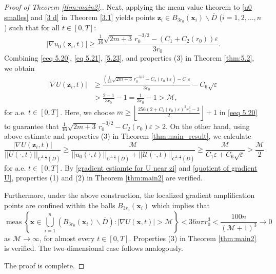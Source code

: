 \documentclass[11pt,reqno,oneside]{amsart}
\numberwithin{equation}{section}
\theoremstyle{definition}
\theoremstyle{remark}
\numberwithin{equation}{section}
\begin{document}
\begin{proof}[Proof of Theorem \ref{thm:main2}.]
		Next, applying the mean value theorem to \eqref{u0 smalles} and \eqref{3 d} in Theorem \ref{3.1} yields points $\mathbf{z}_i \in B_{3r_0}(\mathbf{x}_i) \backslash \overline{D}$ ($i=1,2,\dots,n$) such that for all $t \in [0,T]$:
		\begin{equation}\label{5.23}
			|\nabla u_0(\mathbf{z}_i,t)| \geqslant \frac{
				\tfrac{1}{16}\sqrt{2m+3} \, r_0^{-3/2} - \left(C_1 + C_2(r_0)\right)\varepsilon
			}{3r_0}.
		\end{equation}
		Combining \eqref{eeq 5.20}, \eqref{eq 5.21}, \eqref{5.23}, and properties (3) in Theorem \ref{thm:5.2}, we obtain
		\begin{equation}\label{gradient estiamte for U near zi}
			\begin{aligned}
				|\nabla U(\mathbf{z}_i,t)| &\geqslant \frac{\left(
					\tfrac{1}{16}\sqrt{2m+3} \, r_0^{-3/2} -C_2(r_0)\varepsilon\right)-  C_1\varepsilon
				}{3r_0} - C_6\sqrt{\varepsilon} \\
				& > \frac{2 - 1}{3r_0} - 1 = \frac{1}{3r_0} - 1 > \mathcal{M},
			\end{aligned}
		\end{equation}
		for a.e. $t \in [0,T]$. Here, we choose $m \geqslant \left\lfloor \frac{256(2 + C_2(r_0)\varepsilon)^2 r_{0}^{3} - 3}{2} \right\rfloor +1$ in \eqref{eeq 5.20} to guarantee that  $	\tfrac{1}{16}\sqrt{2m+3} \, r_0^{-3/2} -C_2(r_0)\varepsilon>2 $. On the other hand, using above estimate and properties (3) in Theorem \ref{thm:main_result}, we calculate  
		\begin{equation}\label{quotient of gradient U}
		\frac{|\nabla U(\mathbf{z}_i,t)|}{||U(\cdot,t)||_{C^{1,\frac{1}{2}}(\overline{D})}}\geqslant \frac{\mathcal{M}}{||u_0(\cdot,t)||_{C^{1,\frac{1}{2}}(\overline{D})}+||\mathscr{U}(\cdot,t)||_{C^{1,\frac{1}{2}}(\overline{D})}} \geqslant \frac{\mathcal{M}}{C_1\varepsilon+C_6\sqrt{\varepsilon}} > \frac{\mathcal{M}}{2}
		\end{equation}
		for a.e. $t\in [0,T]$. 	By \eqref{gradient estiamte for U near zi} and \eqref{quotient of gradient U}, properties (1) and (2) in Theorem \ref{thm:main2} are verified. 
		
		Furthermore, under the above construction, the localized gradient amplification points are confined within the balls $B_{3r_0}(\mathbf{x}_i)$ which implies that 
		\begin{equation*}
			\operatorname{meas}\left\{ \mathbf{x} \in \bigcup_{i=1}^{n} \left(B_{3r_0}(\mathbf{x}_i)\backslash \overline{D}\right) : |\nabla U(\mathbf{x},t)| > \mathcal{M} \right\} < 36n\pi r_0^3 < \frac{100n}{(\mathcal{M} + 1)^3}  \to 0
		\end{equation*}
		as $\mathcal{M} \to \infty$, for almost every $t \in [0,T]$. Properties (3) in Theorem \ref{thm:main2} is verified. The two-dimensional case follows analogously.
		
		The proof is complete.
	\end{proof}
	
\end{document}
